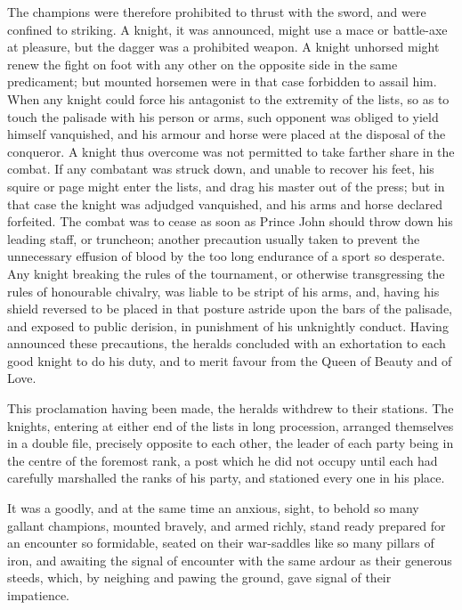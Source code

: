 The champions were therefore prohibited to thrust with the sword, and
were confined to striking. A knight, it was announced, might use a mace
or battle-axe at pleasure, but the dagger was a prohibited weapon. A
knight unhorsed might renew the fight on foot with any other on the
opposite side in the same predicament; but mounted horsemen were in that
case forbidden to assail him. When any knight could force his antagonist
to the extremity of the lists, so as to touch the palisade with his
person or arms, such opponent was obliged to yield himself vanquished,
and his armour and horse were placed at the disposal of the conqueror. A
knight thus overcome was not permitted to take farther share in the
combat. If any combatant was struck down, and unable to recover his
feet, his squire or page might enter the lists, and drag his master out
of the press; but in that case the knight was adjudged vanquished, and
his arms and horse declared forfeited. The combat was to cease as soon
as Prince John should throw down his leading staff, or truncheon;
another precaution usually taken to prevent the unnecessary effusion of
blood by the too long endurance of a sport so desperate. Any knight
breaking the rules of the tournament, or otherwise transgressing the
rules of honourable chivalry, was liable to be stript of his arms, and,
having his shield reversed to be placed in that posture astride upon the
bars of the palisade, and exposed to public derision, in punishment of
his unknightly conduct. Having announced these precautions, the heralds
concluded with an exhortation to each good knight to do his duty, and to
merit favour from the Queen of Beauty and of Love.

This proclamation having been made, the heralds withdrew to their
stations. The knights, entering at either end of the lists in long
procession, arranged themselves in a double file, precisely opposite to
each other, the leader of each party being in the centre of the foremost
rank, a post which he did not occupy until each had carefully marshalled
the ranks of his party, and stationed every one in his place.

It was a goodly, and at the same time an anxious, sight, to behold so
many gallant champions, mounted bravely, and armed richly, stand ready
prepared for an encounter so formidable, seated on their war-saddles
like so many pillars of iron, and awaiting the signal of encounter with
the same ardour as their generous steeds, which, by neighing and pawing
the ground, gave signal of their impatience.

